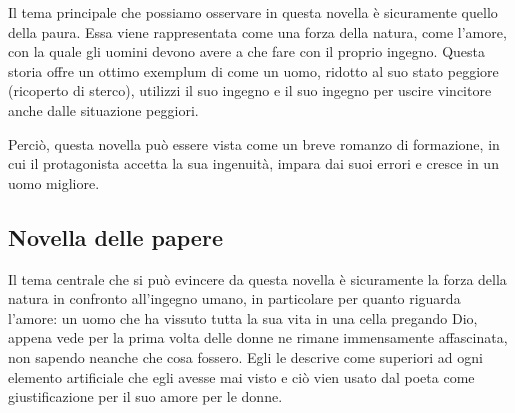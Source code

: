 \documentclass[10pt,a4paper]{article}
\begin{document}
Il tema principale che possiamo osservare in questa novella è sicuramente quello della paura. Essa viene rappresentata come una forza della natura, come l'amore, con la quale gli uomini devono avere a che fare con il proprio ingegno. Questa storia offre un ottimo exemplum di come un uomo, ridotto al suo stato peggiore (ricoperto di sterco), utilizzi il suo ingegno e il suo ingegno per uscire vincitore anche dalle situazione peggiori.

Perciò, questa novella può essere vista come un breve romanzo di formazione, in cui il protagonista accetta la sua ingenuità, impara dai suoi errori e cresce in un uomo migliore.

\subsection{Novella delle papere}

Il tema centrale che si può evincere da questa novella è sicuramente la forza della natura in confronto all'ingegno umano, in particolare per quanto riguarda l'amore: un uomo che ha vissuto tutta la sua vita in una cella pregando Dio, appena vede per la prima volta delle donne ne rimane immensamente affascinata, non sapendo neanche che cosa fossero. Egli le descrive come superiori ad ogni elemento artificiale che egli avesse mai visto e ciò vien usato dal poeta come giustificazione per il suo amore per le donne.
\end{document}
